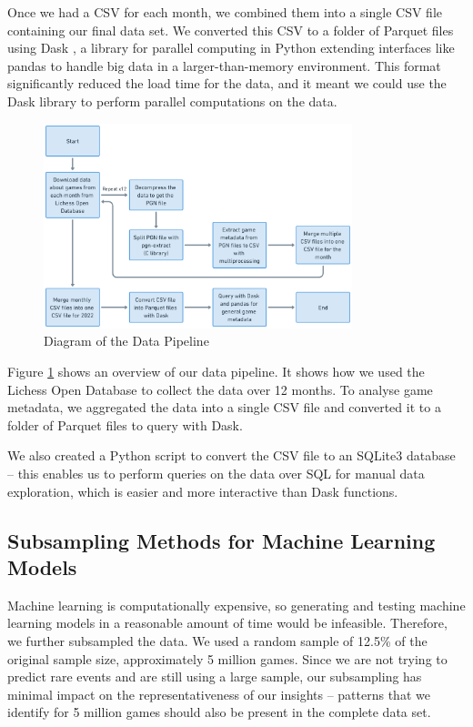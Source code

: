 \documentclass[a4paper, 11pt]{article}
\begin{document}
Once we had a CSV for each month, we combined them into a single CSV file containing our final data set. We converted this CSV to a folder of Parquet files using Dask \cite{dask}, a library for parallel computing in Python extending  interfaces like pandas \cite{pandas} to handle big data in a larger-than-memory environment. This format significantly reduced the load time for the data, and it meant we could use the Dask library to perform parallel computations on the data.

\begin{figure}[H]
    \centering
    \caption{Diagram of the Data Pipeline}
    \label{fig:dataPipeline}
    \includegraphics[width=0.8\textwidth]{Data Pipeline.png}
\end{figure}

Figure \ref{fig:dataPipeline} shows an overview of our data pipeline. It shows how we used the Lichess Open Database to collect the data over 12 months. To analyse game metadata, we aggregated the data into a single CSV file and converted it to a folder of Parquet files to query with Dask.

We also created a Python script to convert the CSV file to an SQLite3 database -- this enables us to perform queries on the data over SQL for manual data exploration, which is easier and more interactive than Dask functions.

\subsection{Subsampling Methods for Machine Learning Models}
Machine learning is computationally expensive, so generating and testing machine learning models in a reasonable amount of time would be infeasible. Therefore, we further subsampled the data. We used a random sample of 12.5\% of the original sample size, approximately 5 million games. Since we are not trying to predict rare events and are still using a large sample, our subsampling has minimal impact on the representativeness of our insights -- patterns that we identify for 5 million games should also be present in the complete data set.
\end{document}
